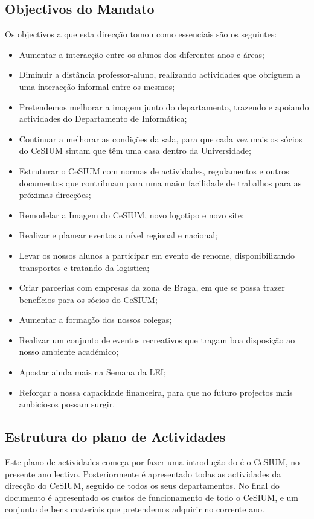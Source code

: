 \subsection{Objectivos do Mandato}
Os objectivos a que esta direcção tomou como essenciais são os seguintes:
\begin{itemize}
\item Aumentar a interacção entre os alunos dos diferentes anos e áreas;
\item Diminuir a distância professor-aluno, realizando actividades que obriguem a uma interacção informal entre os mesmos;
\item Pretendemos melhorar a imagem junto do departamento, trazendo e apoiando actividades do Departamento de Informática;
\item Continuar a melhorar as condições da sala, para que cada vez mais os sócios do CeSIUM sintam que têm uma casa dentro da Universidade;
\item Estruturar o CeSIUM com normas de actividades, regulamentos e outros documentos que contribuam para uma maior facilidade de trabalhos para as próximas direcções;
\item Remodelar a Imagem do CeSIUM, novo logotipo e novo site;
\item Realizar e planear eventos a nível regional e nacional;
\item Levar os nossos alunos a participar em evento de renome, disponibilizando transportes e tratando da logistica;
\item Criar parcerias com empresas da zona de Braga, em que se possa trazer benefícios para os sócios do CeSIUM;
\item Aumentar a formação dos nossos colegas;
\item Realizar um conjunto de eventos recreativos que tragam boa disposição ao nosso ambiente académico;
\item Apostar ainda mais na Semana da LEI;
\item Reforçar a nossa capacidade financeira, para que no futuro projectos mais ambiciosos possam surgir.
\end{itemize}

\subsection{Estrutura do plano de Actividades}
\indent Este plano de actividades começa por fazer uma introdução do é o CeSIUM, no presente ano lectivo. Posteriormente é apresentado todas as actividades da direcção do CeSIUM, seguido de todos os seus departamentos. No final do documento é apresentado os custos de funcionamento de todo o CeSIUM, e um conjunto de bens materiais que pretendemos adquirir no corrente ano.

\newpage
